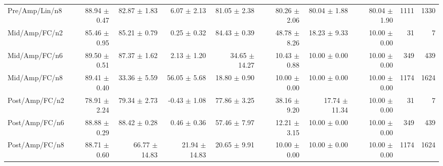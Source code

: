 \begin{table}[!t]
\begin{tabular}{lrrrrrrrrr}
Pre/Amp/Lin/n8 & 88.94 $\pm$ 0.47 & 82.87 $\pm$ 1.83 & 6.07 $\pm$ 2.13 & 81.05 $\pm$ 2.38 & 80.26 $\pm$ 2.06 & 80.04 $\pm$ 1.88 & 80.04 $\pm$ 1.90 & 1111 & 1330 \\
Mid/Amp/FC/n2 & 85.46 $\pm$ 0.95 & 85.21 $\pm$ 0.79 & 0.25 $\pm$ 0.32 & 84.43 $\pm$ 0.39 & 48.78 $\pm$ 8.26 & 18.23 $\pm$ 9.33 & 10.00 $\pm$ 0.00 & 31 & 7 \\
Mid/Amp/FC/n6 & 89.50 $\pm$ 0.51 & 87.37 $\pm$ 1.62 & 2.13 $\pm$ 1.20 & 34.65 $\pm$ 14.27 & 10.43 $\pm$ 0.88 & 10.00 $\pm$ 0.00 & 10.00 $\pm$ 0.00 & 349 & 439 \\
Mid/Amp/FC/n8 & 89.41 $\pm$ 0.40 & 33.36 $\pm$ 5.59 & 56.05 $\pm$ 5.68 & 18.80 $\pm$ 0.90 & 10.00 $\pm$ 0.00 & 10.00 $\pm$ 0.00 & 10.00 $\pm$ 0.00 & 1174 & 1624 \\
Post/Amp/FC/n2 & 78.91 $\pm$ 2.24 & 79.34 $\pm$ 2.73 & -0.43 $\pm$ 1.08 & 77.86 $\pm$ 3.25 & 38.16 $\pm$ 9.20 & 17.74 $\pm$ 11.34 & 10.00 $\pm$ 0.00 & 31 & 7 \\
Post/Amp/FC/n6 & 88.88 $\pm$ 0.29 & 88.42 $\pm$ 0.28 & 0.46 $\pm$ 0.36 & 57.46 $\pm$ 7.97 & 12.21 $\pm$ 3.15 & 10.00 $\pm$ 0.00 & 10.00 $\pm$ 0.00 & 349 & 439 \\
Post/Amp/FC/n8 & 88.71 $\pm$ 0.60 & 66.77 $\pm$ 14.83 & 21.94 $\pm$ 14.83 & 20.65 $\pm$ 9.91 & 10.00 $\pm$ 0.00 & 10.00 $\pm$ 0.00 & 10.00 $\pm$ 0.00 & 1174 & 1624 \\
\bottomrule
\end{tabular}
\end{table}
